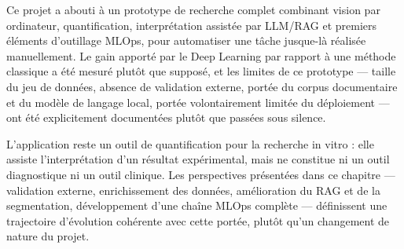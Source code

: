 \documentclass[12pt,a4paper]{report}
\begin{document}
Ce projet a abouti à un prototype de recherche complet combinant vision par ordinateur, quantification, interprétation assistée par LLM/RAG et premiers éléments d'outillage MLOps, pour automatiser une tâche jusque-là réalisée manuellement. Le gain apporté par le Deep Learning par rapport à une méthode classique a été mesuré plutôt que supposé, et les limites de ce prototype --- taille du jeu de données, absence de validation externe, portée du corpus documentaire et du modèle de langage local, portée volontairement limitée du déploiement --- ont été explicitement documentées plutôt que passées sous silence.

L'application reste un outil de quantification pour la recherche in vitro : elle assiste l'interprétation d'un résultat expérimental, mais ne constitue ni un outil diagnostique ni un outil clinique. Les perspectives présentées dans ce chapitre --- validation externe, enrichissement des données, amélioration du RAG et de la segmentation, développement d'une chaîne MLOps complète --- définissent une trajectoire d'évolution cohérente avec cette portée, plutôt qu'un changement de nature du projet.
\end{document}
